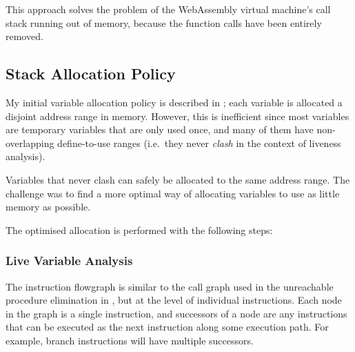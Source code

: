 \documentclass[00-main.tex]{subfiles}
\begin{document}
This approach solves the problem of the WebAssembly virtual machine's call stack running out of memory, because the function calls have been entirely removed.

\FloatBarrier%

\subsection{Stack Allocation Policy}\label{sec:impl:optimised stack allocation}

My initial variable allocation policy is described in ; each variable is allocated a disjoint address range in memory.
However, this is inefficient since most variables are temporary variables that are only used once, and many of them have non-overlapping define-to-use ranges (i.e.\ they never \emph{clash} in the context of liveness analysis).

Variables that never clash can safely be allocated to the same address range.
The challenge was to find a more optimal way of allocating variables to use as little memory as possible.

The optimised allocation is performed with the following steps:


\subsubsection{Live Variable Analysis}

\newcommand{\lvadef}{\ensuremath{\mathit{def}}}
\newcommand{\lvaref}{\ensuremath{\mathit{ref}}}

The instruction flowgraph is similar to the call graph used in the unreachable procedure elimination in , but at the level of individual instructions.
Each node in the graph is a single instruction, and successors of a node are any instructions that can be executed as the next instruction along some execution path.
For example, branch instructions will have multiple successors.
\end{document}
